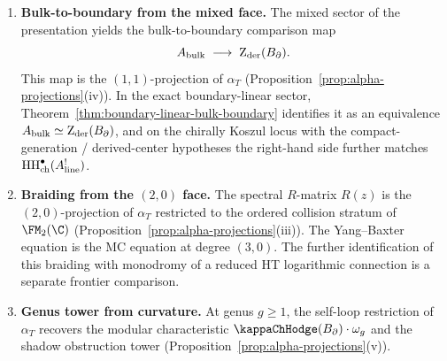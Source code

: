 \begin{theorem}
\begin{enumerate}[label=\textup{(\roman*)}]
\item \textbf{Bulk-to-boundary from the mixed face.}
 The mixed sector of the presentation yields the bulk-to-boundary
 comparison map
 \[
 A_{\mathrm{bulk}}
 \;\longrightarrow\;
 \operatorname{Z}_{\mathrm{der}}(B_{\partial}).
 \]
 This map is the $(1,1)$-projection of
 $\alpha_T$
 \textup{(}Proposition~\textup{\ref{prop:alpha-projections}(iv)}\textup{)}.
 In the exact boundary-linear sector,
 Theorem~\textup{\ref{thm:boundary-linear-bulk-boundary}} identifies
 it as an equivalence
 $A_{\mathrm{bulk}} \simeq \operatorname{Z}_{\mathrm{der}}(B_{\partial})$, and on the chirally Koszul locus
 with the compact-generation / derived-center hypotheses the
 right-hand side further matches
 $\operatorname{HH}^\bullet_{\mathrm{ch}}(A^!_{\mathrm{line}})$.

\item \textbf{Braiding from the $(2,0)$ face.}
 The spectral $R$-matrix $R(z)$ is the
 $(2,0)$-projection of $\alpha_T$ restricted to
 the ordered collision stratum of $\FM_2(\C)$
 \textup{(}Proposition~\textup{\ref{prop:alpha-projections}(iii)}\textup{)}.
 The Yang--Baxter equation is the MC equation at degree $(3,0)$.
 The further identification of this braiding with monodromy of a reduced HT
 logarithmic connection is a separate frontier comparison.

\item \textbf{Genus tower from curvature.}
 At genus $g \ge 1$, the self-loop restriction of $\alpha_T$
 recovers the modular characteristic $\kappaChHodge(\Bbound)\cdot\omega_g$
 and the shadow obstruction tower
 \textup{(}Proposition~\textup{\ref{prop:alpha-projections}(v)}\textup{)}.
\end{enumerate}
\end{theorem}

